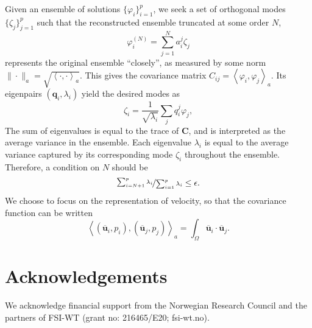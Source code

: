 \documentclass[a0,portrait]{a0poster}
\begin{document}
\begin{multicols}{2}
Given an ensemble of solutions $\{\varphi_i\}_{i=1}^{p}$, we seek a set of
orthogonal modes $\{\zeta_j\}_{j=1}^p$ such that the reconstructed ensemble
truncated at some order $N$,
\[
  \varphi_i^{(N)} = \sum_{j=1}^N a_i^j \zeta_j
\]
represents the original ensemble ``closely'', as measured by some norm
$\|\cdot\|_a = \sqrt{\left<\cdot,\cdot\right>_a}$. This gives the covariance
matrix $C_{ij} = \left< \varphi_i, \varphi_j \right>_a$. Its eigenpairs $(\bm
q_i, \lambda_i)$ yield the desired modes as
\[
  \zeta_i = \frac{1}{\sqrt{\lambda_i}} \sum_j q_i^j \varphi_j,
\]
The sum of eigenvalues is equal to the trace of $\bm C$, and is interpreted as
the average variance in the ensemble. Each eigenvalue $\lambda_i$ is equal to
the average variance captured by its corresponding mode $\zeta_i$ throughout the
ensemble. Therefore, a condition on $N$ should be
\[
  \nicefrac{\sum_{i=N+1}^p \lambda_i}{\sum_{i=1}^p \lambda_i} \leq \epsilon.
\]
We choose to focus on the representation of velocity, so that the covariance
function can be written
\[
  \left<(\overline{\bm u}_i, p_i), (\overline{\bm u}_j, p_j)\right>_a
  = \int_\Omega \overline{\bm u}_i \cdot \overline{\bm u}_j.
\]

\section*{\LARGE Acknowledgements}

We acknowledge financial support from the Norwegian Research Council and the
partners of FSI-WT (grant no: 216465/E20; fsi-wt.no).


\end{multicols}
\end{document}
